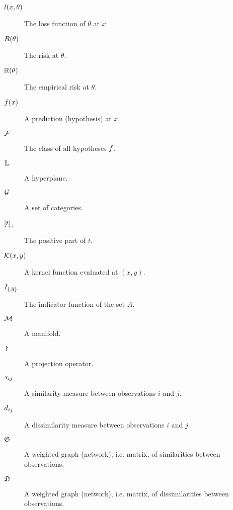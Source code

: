 \begin{description}
\item[$l(x,\theta)$] The loss function of $\theta$ at $x$.
\item[$R(\theta)$]  The risk at $\theta$.
\item[$\mathbb{R}(\theta)$] The empirical risk at $\theta$.
\item[$f(x)$] A prediction (hypothesis) at $x$.
\item[$\mathcal{F}$] The class of all hypotheses $f$.
\item[$\mathbb{L}$] A hyperplane.
\item[$\mathcal{G}$] A set of categories. 
\item[$\left[ t \right]_+$] The positive part of $t$.
\item[$\mathcal{K}(x,y)$] A kernel function evaluated at $(x,y)$.
\item[$I_{\left\{ A \right\}}$] The indicator function of the set $A$.
\item[$\mathcal{M}$] A manifold.
\item[$\project$] A projection operator.

\item[$s_{ij}$] A similarity measure between observations $i$ and $j$. 
\item[$d_{ij}$] A dissimilarity measure between observations $i$ and $j$. 
\item[$\mathfrak{S}$] A weighted graph (network), i.e. matrix, of similarities between observations. 
\item[$\mathfrak{D}$] A weighted graph (network), i.e. matrix, of dissimilarities between observations. 


\end{description}



